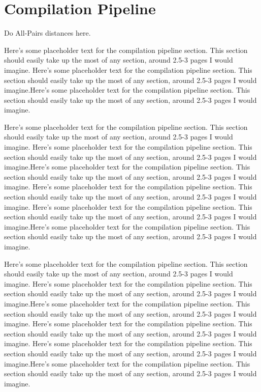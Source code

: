 \documentclass[preprint]{sigplanconf}
\begin{document}
\section{Compilation Pipeline}
\label{Compilation}

Do All-Pairs distances here.

Here's some placeholder text for the compilation pipeline section.  This
section should easily take up the most of any section, around 2.5-3 pages I
would imagine.
Here's some placeholder text for the compilation pipeline section.  This
section should easily take up the most of any section, around 2.5-3 pages I
would imagine.Here's some placeholder text for the compilation pipeline section.
 This
section should easily take up the most of any section, around 2.5-3 pages I
would imagine.

Here's some placeholder text for the compilation pipeline section.  This
section should easily take up the most of any section, around 2.5-3 pages I
would imagine.
Here's some placeholder text for the compilation pipeline section.  This
section should easily take up the most of any section, around 2.5-3 pages I
would imagine.Here's some placeholder text for the compilation pipeline section.
 This
section should easily take up the most of any section, around 2.5-3 pages I
would imagine.
Here's some placeholder text for the compilation pipeline section.  This
section should easily take up the most of any section, around 2.5-3 pages I
would imagine.
Here's some placeholder text for the compilation pipeline section.  This
section should easily take up the most of any section, around 2.5-3 pages I
would imagine.Here's some placeholder text for the compilation pipeline section.
 This
section should easily take up the most of any section, around 2.5-3 pages I
would imagine.

Here's some placeholder text for the compilation pipeline section.  This
section should easily take up the most of any section, around 2.5-3 pages I
would imagine.
Here's some placeholder text for the compilation pipeline section.  This
section should easily take up the most of any section, around 2.5-3 pages I
would imagine.Here's some placeholder text for the compilation pipeline section.
 This
section should easily take up the most of any section, around 2.5-3 pages I
would imagine.
Here's some placeholder text for the compilation pipeline section.  This
section should easily take up the most of any section, around 2.5-3 pages I
would imagine.
Here's some placeholder text for the compilation pipeline section.  This
section should easily take up the most of any section, around 2.5-3 pages I
would imagine.Here's some placeholder text for the compilation pipeline section.
 This
section should easily take up the most of any section, around 2.5-3 pages I
would imagine.
\end{document}
